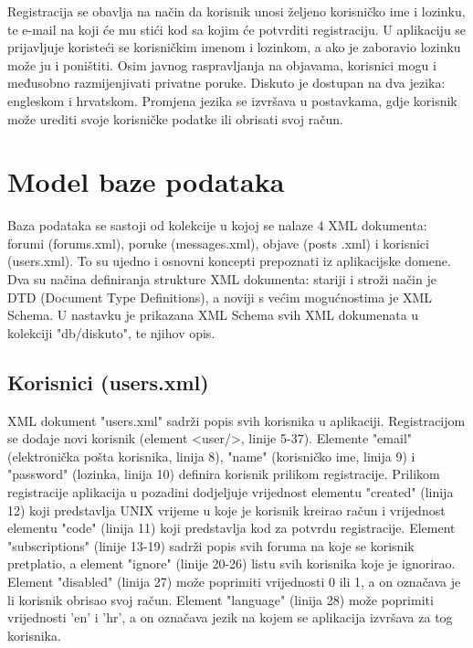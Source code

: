 \documentclass{foi}
\begin{document}
Registracija se obavlja na način da korisnik unosi željeno korisničko ime i lozinku, te e-mail na koji će mu stići kod sa kojim će potvrditi registraciju. U aplikaciju se prijavljuje koristeći se korisničkim imenom i lozinkom, a ako je zaboravio lozinku može ju i poništiti. Osim javnog raspravljanja na objavama, korisnici mogu i međusobno razmijenjivati privatne poruke. Diskuto je dostupan na dva jezika: engleskom i hrvatskom. Promjena jezika se izvršava u postavkama, gdje korisnik može urediti svoje korisničke podatke ili obrisati svoj račun.

\chapter{Model baze podataka}

Baza podataka se sastoji od kolekcije u kojoj se nalaze 4 XML dokumenta: forumi (forums.xml), poruke (messages.xml), objave (posts .xml) i korisnici (users.xml). To su ujedno i osnovni koncepti prepoznati iz aplikacijske domene. Dva su načina definiranja strukture XML dokumenta: stariji i stroži način je DTD (Document Type Definitions), a noviji s većim mogućnostima je XML Schema. U nastavku je prikazana XML Schema svih XML dokumenata u kolekciji "db/diskuto", te njihov opis.

\section{Korisnici (users.xml)}

XML dokument "users.xml" sadrži popis svih korisnika u aplikaciji. Registracijom se dodaje novi korisnik (element <user/>, linije 5-37). Elemente "email" (elektronička pošta korisnika, linija 8), "name" (korisničko ime, linija 9) i "password" (lozinka, linija 10) definira korisnik prilikom registracije. Prilikom registracije aplikacija u pozadini dodjeljuje vrijednost elementu "created" (linija 12) koji predstavlja UNIX vrijeme u koje je korisnik kreirao račun i vrijednost elementu "code" (linija 11) koji predstavlja kod za potvrdu registracije. Element "subscriptions" (linije 13-19) sadrži popis svih foruma na koje se korisnik pretplatio, a element "ignore" (linije 20-26) listu svih korisnika koje je ignorirao. Element "disabled" (linija 27) može poprimiti vrijednosti 0 ili 1, a on označava je li korisnik obrisao svoj račun. Element "language" (linija 28) može poprimiti vrijednosti 'en' i 'hr', a on označava jezik na kojem se aplikacija izvršava za tog korisnika.
\end{document}
